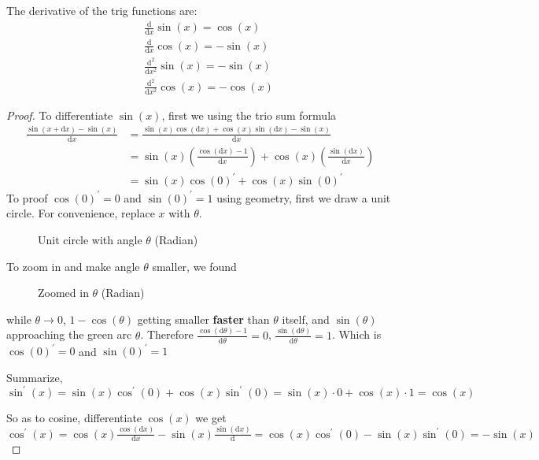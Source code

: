 \begin{enumerate}
        The derivative of the trig functions are:
        \begin{align*}
            & \frac{\mathrm{d}}{\mathrm{d}x}\sin(x)=\cos(x) \\
            & \frac{\mathrm{d}}{\mathrm{d}x}\cos(x)=-\sin(x) \\
            & \frac{\mathrm{d}^2}{\mathrm{d}x^2}\sin(x)=-\sin(x) \\
            & \frac{\mathrm{d}^2}{\mathrm{d}x^2}\cos(x)=-\cos(x)
        \end{align*}
        \begin{proof}
            To differentiate $\sin(x)$, first we using the trio sum formula
            \begin{align*}
                \frac{\sin(x+\mathrm{d}x)-\sin(x)}{\mathrm{d}x} & =\frac{\sin(x)\cos(\mathrm{d}x)+\cos(x)\sin(\mathrm{d}x)-\sin(x)}{\mathrm{d}x} & \\
                                                                & =\sin(x)\left(\frac{\cos(\mathrm{d}x)-1}{\mathrm{d}x}\right)+\cos(x)\left(\frac{\sin(\mathrm{d}x)}{\mathrm{d}x}\right) \\
                                                                & =\sin(x)\cos(0)^\prime+\cos(x)\sin(0)^\prime
            \end{align*}
            To proof $\cos(0)^\prime=0$ and $\sin(0)^\prime=1$ using geometry, first we draw a unit circle. For convenience, replace $x$ with $\theta$.
            \begin{figure}[H]
                \centering
                \caption{Unit circle with angle $\theta$ (Radian)}
            \end{figure}
            To zoom in and make angle $\theta$ smaller, we found
            \begin{figure}[H]
                \centering
                \caption{Zoomed in $\theta$ (Radian)}
            \end{figure}
            while $\theta\to 0$, $1-\cos(\theta)$ getting smaller \textbf{faster} than $\theta$ itself, and $\sin(\theta)$ approaching the green arc $\theta$. Therefore $\frac{\cos(\mathrm{d}\theta)-1}{\mathrm{d}\theta}=0$, $\frac{\sin(\mathrm{d}\theta)}{\mathrm{d}\theta}=1$. Which is $\cos(0)^\prime=0$ and $\sin(0)^\prime=1$

            Summarize, $\sin^\prime(x)=\sin(x)\cos^\prime(0)+\cos(x)\sin^\prime(0)=\sin(x)\cdot 0+\cos(x)\cdot 1=\cos(x)$

            So as to cosine, differentiate $\cos(x)$ we get $\cos^\prime(x)=\cos(x)\frac{\cos(\mathrm{d}x)}{\mathrm{d}x}-\sin(x)\frac{\sin(\mathrm{d}x)}{\mathrm{d}}=\cos(x)\cos^\prime(0)-\sin(x)\sin^\prime(0)=-\sin(x)$
            \end{proof}
\end{enumerate}
